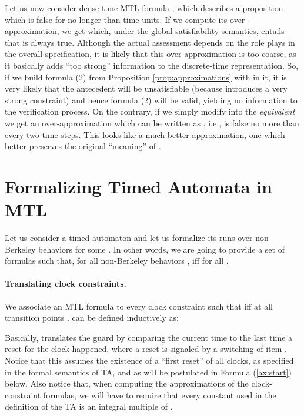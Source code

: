 \documentclass[a4paper]{article}
\newcommand{\frf}[1]{(\ref{#1})}
\theoremstyle{plain}
\theoremstyle{definition}
\begin{document}
Let us now consider dense-time MTL formula , which describes a proposition  which is false for no longer than  time units.
If we compute its over-ap\-prox\-i\-ma\-tion, we get  which, under the global satisfiability semantics, entails that  is always true.
Although the actual assessment depends on the role  plays in the overall specification, it is likely that this over-ap\-prox\-i\-ma\-tion is too coarse, as it basically adds ``too strong'' information to the discrete-time representation.
So, if we build formula (2) from Proposition \ref{prop:approximations} with  in it, it is very likely that the antecedent will be unsatisfiable (because  introduces a very strong constraint) and hence formula (2) will be valid, yielding no information to the verification process.
On the contrary, if we simply modify  into the \emph{equivalent}  we get an over-ap\-prox\-i\-ma\-tion which can be written as , i.e.,  is false no more than every two time steps.
This looks like a much better approximation, one which better preserves the original ``meaning'' of .










\section{Formalizing Timed Automata in MTL} \label{sec:formalizingTAs}
Let us consider a timed automaton  and let us formalize its runs over non-Berkeley behaviors for some .
In other words, we are going to provide a set of formulas  such that, for all non-Berkeley behaviors ,  iff  for all .



\paragraph{Translating clock constraints.}
We associate an MTL formula  to every clock constraint  such that  iff  at all transition points .
 can be defined inductively as:

Basically,  translates the guard  by comparing the current time to the last time a reset for the clock  happened, where a reset is signaled by a switching of item .
Notice that this assumes the existence of a ``first reset'' of all clocks, as specified in the formal semantics of TA, and as will be postulated in Formula \frf{ax:start} below.
Also notice that, when computing the approximations of the clock-constraint formulas, we will have to require that every constant  used in the definition of the TA is an integral multiple of .
\end{document}
